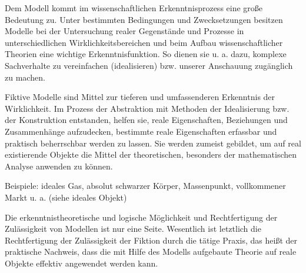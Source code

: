 \documentclass[a4paper, 12pt]{scrartcl}
\begin{document}
Dem Modell kommt im wissenschaftlichen Erkenntnisprozess eine große Bedeutung zu. Unter bestimmten Bedingungen und Zwecksetzungen besitzen Modelle bei der Untersuchung realer Gegenstände und Prozesse in unterschiedlichen Wirklichkeitsbereichen und beim Aufbau wissenschaftlicher Theorien eine wichtige Erkenntnisfunktion. So dienen sie u. a. dazu, komplexe Sachverhalte zu vereinfachen (idealisieren) bzw. unserer Anschauung zugänglich zu machen.

Fiktive Modelle sind Mittel zur tieferen und umfassenderen Erkenntnis der Wirklichkeit. Im Prozess der Abstraktion mit Methoden der Idealisierung bzw. der Konstruktion entstanden, helfen sie, reale Eigenschaften, Beziehungen und Zusammenhänge aufzudecken, bestimmte reale Eigenschaften erfassbar und praktisch beherrschbar werden zu lassen. Sie werden zumeist gebildet, um auf real existierende Objekte die Mittel der theoretischen, besonders der mathematischen Analyse anwenden zu können.

Beispiele: ideales Gas, absolut schwarzer Körper, Massenpunkt, vollkommener Markt u. a. (siehe ideales Objekt)

Die erkenntnistheoretische und logische Möglichkeit und Rechtfertigung der Zulässigkeit von Modellen ist nur eine Seite. Wesentlich ist letztlich die Rechtfertigung der Zulässigkeit der Fiktion durch die tätige Praxis, das heißt der praktische Nachweis, dass die mit Hilfe des Modells aufgebaute Theorie auf reale Objekte effektiv angewendet werden kann.
\end{document}
